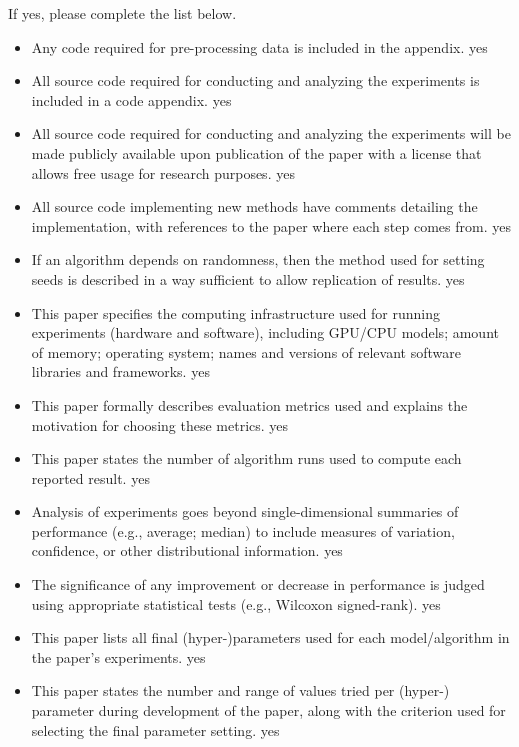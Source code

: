 \noindent If yes, please complete the list below.
\begin{itemize}
\item Any code required for pre-processing data is included in the appendix. yes
\item All source code required for conducting and analyzing the experiments is included in a code appendix. yes
\item All source code required for conducting and analyzing the experiments will be made publicly available upon publication of the paper with a license that allows free usage for research purposes. yes
\item All source code implementing new methods have comments detailing the implementation, with references to the paper where each step comes from. yes
\item If an algorithm depends on randomness, then the method used for setting seeds is described in a way sufficient to allow replication of results. yes
\item This paper specifies the computing infrastructure used for running experiments (hardware and software), including GPU/CPU models; amount of memory; operating system; names and versions of relevant software libraries and frameworks. yes
\item This paper formally describes evaluation metrics used and explains the motivation for choosing these metrics. yes
\item This paper states the number of algorithm runs used to compute each reported result. yes
\item Analysis of experiments goes beyond single-dimensional summaries of performance (e.g., average; median) to include measures of variation, confidence, or other distributional information. yes
\item The significance of any improvement or decrease in performance is judged using appropriate statistical tests (e.g., Wilcoxon signed-rank). yes
\item This paper lists all final (hyper-)parameters used for each model/algorithm in the paper’s experiments. yes
\item This paper states the number and range of values tried per (hyper-) parameter during development of the paper, along with the criterion used for selecting the final parameter setting. yes
\end{itemize}